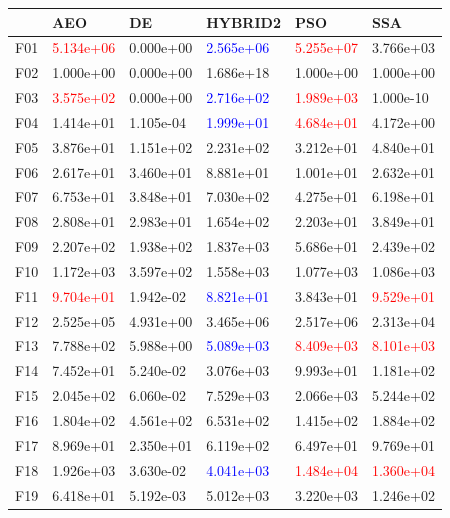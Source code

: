 \documentclass{article}
\begin{document}
\begin{table}[H]
	\centering
	\begin{tabular}{|l|lllll|}
		\hline
{} &        AEO &         DE &    HYBRID2 &        PSO &        SSA \\
\hline
F01  &  \textcolor{red}{5.134e+06} &  0.000e+00 &  \textcolor{blue}{2.565e+06} &  \textcolor{red}{5.255e+07} &  3.766e+03 \\
F02  &  1.000e+00 &  0.000e+00 &  1.686e+18 &  1.000e+00 &  1.000e+00 \\
F03  &  \textcolor{red}{3.575e+02} &  0.000e+00 &  \textcolor{blue}{2.716e+02} &  \textcolor{red}{1.989e+03} &  1.000e-10 \\
F04  &  1.414e+01 &  1.105e-04 &  \textcolor{blue}{1.999e+01} &  \textcolor{red}{4.684e+01} &  4.172e+00 \\
F05  &  3.876e+01 &  1.151e+02 &  2.231e+02 &  3.212e+01 &  4.840e+01 \\
F06  &  2.617e+01 &  3.460e+01 &  8.881e+01 &  1.001e+01 &  2.632e+01 \\
F07  &  6.753e+01 &  3.848e+01 &  7.030e+02 &  4.275e+01 &  6.198e+01 \\
F08  &  2.808e+01 &  2.983e+01 &  1.654e+02 &  2.203e+01 &  3.849e+01 \\
F09  &  2.207e+02 &  1.938e+02 &  1.837e+03 &  5.686e+01 &  2.439e+02 \\
F10  &  1.172e+03 &  3.597e+02 &  1.558e+03 &  1.077e+03 &  1.086e+03 \\
F11  &  \textcolor{red}{9.704e+01} &  1.942e-02 &  \textcolor{blue}{8.821e+01} &  3.843e+01 &  \textcolor{red}{9.529e+01} \\
F12  &  2.525e+05 &  4.931e+00 &  3.465e+06 &  2.517e+06 &  2.313e+04 \\
F13  &  7.788e+02 &  5.988e+00 &  \textcolor{blue}{5.089e+03} &  \textcolor{red}{8.409e+03} &  \textcolor{red}{8.101e+03} \\
F14  &  7.452e+01 &  5.240e-02 &  3.076e+03 &  9.993e+01 &  1.181e+02 \\
F15  &  2.045e+02 &  6.060e-02 &  7.529e+03 &  2.066e+03 &  5.244e+02 \\
F16  &  1.804e+02 &  4.561e+02 &  6.531e+02 &  1.415e+02 &  1.884e+02 \\
F17  &  8.969e+01 &  2.350e+01 &  6.119e+02 &  6.497e+01 &  9.769e+01 \\
F18  &  1.926e+03 &  3.630e-02 &  \textcolor{blue}{4.041e+03} &  \textcolor{red}{1.484e+04} &  \textcolor{red}{1.360e+04} \\
F19  &  6.418e+01 &  5.192e-03 &  5.012e+03 &  3.220e+03 &  1.246e+02 \\

\end{tabular}
\end{table}
\end{document}
